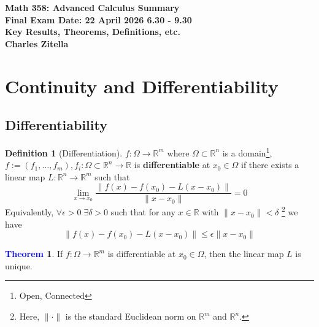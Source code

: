\documentclass[11pt]{article}
\theoremstyle{definition}
\theoremstyle{definition}
\newcommand{\R}[0]{\mathbb{R}}
\newtheorem{theorem}{\textcolor{blue}{Theorem}}
\theoremstyle{definition}
\newtheorem{definition}{\textcolor{OliveGreen}{Definition}}
\theoremstyle{remark}
\begin{document}
\begin{center}
	\textbf{Math 358: Advanced Calculus Summary} \\
	\textbf{Final Exam Date: 22 April 2026 6.30 - 9.30} \\
	\textbf{Key Results, Theorems, Definitions, etc.} \\
	\textbf{Charles Zitella}
\end{center}

\begin{abstract}
	This document contains a summary of all the key definitions, results, and theorems from class before the final exam. Point-set topology in Euclidean space; continuity and differentiability of functions in several variables. Implicit and inverse function theorems, Lagrange multipliers,
    Integrals in several variables, Fubini, change of variables, line and surface integrals, Green's theorem, etc...
\end{abstract}

\tableofcontents

\section{Continuity and Differentiability}

\subsection{Differentiability}

\begin{definition}[Differentiation]
    $f : \Omega \to \R^m$ where $\Omega \subset \R^n$ is a domain\footnote{Open, Connected}, 
    $f := (f_1, \dots, f_m), 
    f_i : \Omega\subset \R^n \to \R$ is \textbf{differentiable} at $x_0 \in \Omega$ if 
    there exists a linear map $L : \R^n \to \R^m$ such that
    \[
        \lim_{x \to x_0} \frac{\|f(x) - f(x_0) - L(x - x_0)\|}{\|x - x_0\|} = 0
    \] 
    Equivalently, $\forall \epsilon > 0 \; \exists \delta > 0$ such that for any $x \in \R$
    with $\|x - x_0\| < \delta$ \footnote{Here, $\| \cdot \|$ is the standard Euclidean norm on
     $\R^m$ and $\R^n$.} we have
    \[
        \| f(x) - f(x_0) -L(x - x_0)\| \leq \epsilon \|x - x_0\|
    \]   
\end{definition}

\begin{theorem}
    If $f : \Omega \to \R^m$ is differentiable at $x_0 \in \Omega$, then the linear map $L$ is unique.
\end{theorem}
\end{document}
